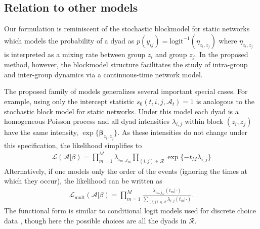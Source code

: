 \subsection{Relation to other models}

Our formulation is reminiscent of the stochastic blockmodel \cite{Nowicki2001} for static networks which models the probability of a dyad as $p(y_{ij}) =\mbox{logit}^{-1}( \eta_{z_i,z_j})$ where $\eta_{z_i,z_j}$ is interpreted as a mixing rate between group $z_i$ and group $z_j$.
In the proposed method, however, the blockmodel structure facilitates the study of intra-group and inter-group dynamics via a continuous-time network model.

The proposed family of models generalizes several important special cases.
For example,  using only the intercept statistic $s_0(t,i,j,\mathcal{A}_t) = 1$ is analogous to the stochastic block model for static networks.
Under this model each dyad is a homogeneous Poisson process and all dyad intensities $\lambda_{i,j}$ within block $(z_i,z_j)$ have the same intensity, $\exp\{\boldsymbol{\beta}_{z_i,z_j}\}$.
As these intensities do not change under this specification, the likelihood simplifies to
\begin{align}
\mathcal{L}(\mathcal{A}|\beta) = \prod_{m=1}^M \lambda_{i_m,j_m}
\prod_{(i,j) \in \mathcal{R}} \exp\{-t_M \lambda_{i,j}\}
\end{align}
Alternatively, if one models only the order of the events (ignoring the times at which they occur), the likelihood can be written as
\begin{align}
\mathcal{L}_{\mbox{mult}}(\mathcal{A}|\beta) = \prod_{m=1}^M \frac{\lambda_{i_m,j_m}(t_m | \cdot)}{\sum_{(i,j) \in \mathcal{R}} \lambda_{i,j}(t_m | \cdot)}.
\label{eqn:multllk}
\end{align}
The functional form is similar to conditional logit models used for discrete choice data \cite{McFadden1973}, though here the possible choices are all the dyads in $\mathcal{R}$.

